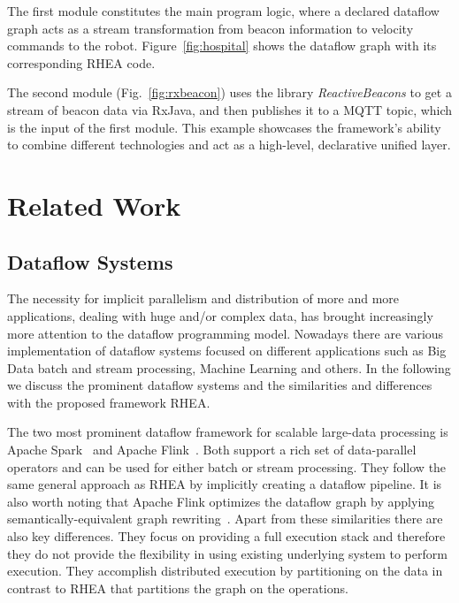 \documentclass[sigplan,screen,10pt]{acmart}
\begin{document}
The first module constitutes the main program logic, where a declared dataflow
graph acts as a stream transformation from beacon information to velocity
commands to the robot. Figure~\ref{fig:hospital} shows the dataflow graph with
its corresponding \textsc{RHEA} code.


The second module (Fig.~\ref{fig:rxbeacon}) uses the library
\textit{ReactiveBeacons}
to get a stream of beacon data via RxJava, and then publishes it to a MQTT topic,
which is the input of the first module. This example showcases the framework's ability
to combine different technologies and act as a high-level, declarative unified layer.


\section{Related Work} \label{sec:related}

\subsection{Dataflow Systems}

The necessity for implicit parallelism and distribution of more and more
applications, dealing with huge and/or complex data, has brought increasingly
more attention to the dataflow programming model. Nowadays there are various
implementation of dataflow systems focused on different applications such as
Big Data batch and stream processing, Machine Learning and others.
In the following we discuss the prominent dataflow systems and the similarities
and differences with the proposed framework \textsc{RHEA}.

The two most prominent dataflow framework for scalable large-data processing
is Apache Spark~\cite{spark} and Apache Flink~\cite{stratosphere}. Both support
a rich set of data-parallel operators and can be used for either batch or
stream processing. They follow the same general approach as \textsc{RHEA} by
implicitly creating a dataflow pipeline. It is also worth noting that Apache Flink
optimizes the dataflow graph by applying semantically-equivalent graph rewriting~\cite{blackbox}.
Apart from these similarities there are also key differences.
They focus on providing a full execution stack and therefore they do not
provide the flexibility in using
existing  underlying system to perform execution. They accomplish distributed
execution by partitioning on the data in contrast to \textsc{RHEA} that partitions
the graph on the operations.
\end{document}

